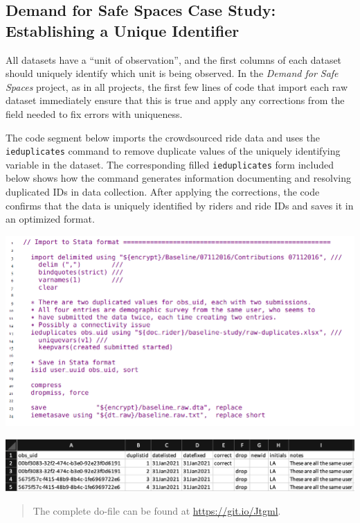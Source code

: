 \documentclass[
]{book}
\begin{document}
\begin{ex}
\hypertarget{demand-for-safe-spaces-case-study-establishing-a-unique-identifier}{%
\subsection{Demand for Safe Spaces Case Study: Establishing a Unique Identifier}\label{demand-for-safe-spaces-case-study-establishing-a-unique-identifier}}

All datasets have a ``unit of observation'', and the first columns of each dataset should uniquely identify which unit is being observed. In the \emph{Demand for Safe Spaces} project, as in all projects, the first few lines of code that import each raw dataset immediately ensure that this is true and apply any corrections from the field needed to fix errors with uniqueness.

The code segment below imports the crowdsourced ride data and uses the \texttt{ieduplicates} command to remove duplicate values of the uniquely identifying variable in the dataset. The corresponding filled \texttt{ieduplicates} form included below shows how the command generates information documenting and resolving duplicated IDs in data collection. After applying the corrections, the code confirms that the data is uniquely identified by riders and ride IDs and saves it in an optimized format.

\includegraphics{examples/ch5-establishing-a-unique-identifier.png}

\includegraphics{examples/duplicates-report-filled.PNG}

\begin{quote}
The complete do-file can be found at \url{https://git.io/Jtgml}.
\end{quote}
\end{ex}
\end{document}
